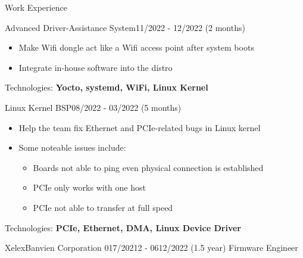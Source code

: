 \documentclass{resume} %
\begin{document}
\begin{rSection}{Work Experience}
\begin{rCompanySubsection}
\begin{rProjectSubsubsection}{Advanced Driver-Assistance System}{11/2022 - 12/2022 (2 months)}
\begin{itemize}
\begin{itemize}
                    \item Make Wifi dongle act like a Wifi access point after system boots
                    \item Integrate in-house software into the distro
                \end{itemize}
            \end{itemize}
            \hspace*{2.5em}Technologies: \textbf{Yocto, systemd, WiFi, Linux Kernel}
        \end{rProjectSubsubsection}
        \begin{rProjectSubsubsection}{Linux Kernel BSP}{08/2022 - 03/2022 (5 months)}
            \begin{itemize}
                \setlength{\itemindent}{1.25em}
                \item Help the team fix Ethernet and PCIe-related bugs in Linux kernel
                \item Some noteable issues include:
                \begin{itemize}
                    \item Boards not able to ping even physical connection is established
                    \item PCIe only works with one host
                    \item PCIe not able to transfer at full speed
                \end{itemize}
            \end{itemize}
            \hspace*{2.5em}Technologies: \textbf{PCIe, Ethernet, DMA, Linux Device Driver}
        \end{rProjectSubsubsection}
    \end{rCompanySubsection}
\begin{rCompanySubsection}
    {XelexBanvien Corporation}
    {017/20212 - 0612/2022 (1.5 year)}
    {Firmware Engineer}
    {}


\end{rCompanySubsection}
\end{rSection}
\end{document}
